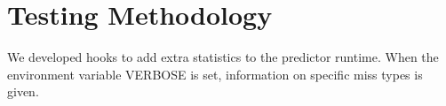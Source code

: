 \section{Testing Methodology}
We developed hooks to add extra statistics to the predictor runtime. When the environment variable VERBOSE is set, information on specific miss types is given. 

